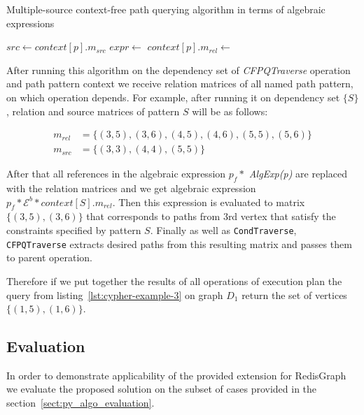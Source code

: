 \begin{algorithm}
\begin{algorithmic}[1]
\caption{Multiple-source context-free path querying algorithm in terms of algebraic expressions}
\label{alg:redisgraph-cfpq}
        \State $src \gets context[p].m_{src}$
        \State $expr \gets$ 
        \State {}
        \State $context[p].m_{rel} \gets$ 
    \EndFor
\EndWhile

\EndFunction
\end{algorithmic}
\end{algorithm}

After running this algorithm on the dependency set of \textit{CFPQTraverse} operation and path pattern context we receive relation matrices of all named path pattern, on which operation depends. For example, after running it on dependency set $\{S\}$, relation and source matrices of pattern $S$ will be as follows:

\begin{align*}
m_{rel} &= \{(3, 5), (3, 6), (4, 5), (4, 6), (5, 5), (5, 6)\} \\
m_{src} &= \{(3, 3), (4, 4), (5, 5)\}
\end{align*}

After that all references in the algebraic expression $p_f *$ \textit{Alg\-Exp(p)} are replaced with the relation matrices and we get algebraic expression $p_f * \mathcal{E}^b * context[S].m_{rel}$. Then this expression is evaluated to matrix $\{(3, 5), (3, 6)\}$ that corresponds to paths from 3rd vertex that satisfy the constraints specified by pattern $S$. Finally as well as \lstinline{CondTraverse}, \lstinline{CFPQTraverse} extracts desired paths from this resulting matrix and passes them to parent operation.

Therefore if we put together the results of all operations of execution plan the query from listing~\ref{lst:cypher-example-3} on graph $D_1$ return the set of vertices $\{(1, 5), (1, 6)\}$.

\subsection{Evaluation}

In order to demonstrate applicability of the provided extension for RedisGraph we evaluate the proposed solution on the subset of cases provided in the section~\ref{sect:py_algo_evaluation}.

